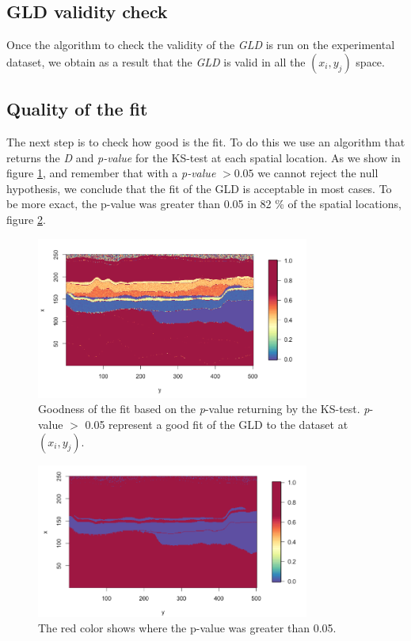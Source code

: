 \subsection{GLD validity check}\label{useCaseGLDValidityCheck}
Once the algorithm to check the validity of the \textit{GLD} is run on the experimental dataset, we obtain as a result that the \textit{GLD} is valid in all the $(x_{i},y_{j})$ space.

\subsection{Quality of the fit}\label{useCaseQualityofFit}
The next step is to check how good is the fit. To do this we use an algorithm that returns the \textit{D} and \textit{p-value} for the KS-test at each spatial location. As we show in figure \ref{fig:p_value}, and remember that with a \textit{p-value} $>0.05$ we cannot reject the null hypothesis, we conclude that the fit of the GLD is acceptable in most cases. To be more exact, the p-value was greater than 0.05 in 82 \% of the spatial locations, figure \ref{fig:p_values_greater_05}.

\begin{figure}[H]
    \centering
    \includegraphics[width=0.8\textwidth]{images/p_value.png}
    \caption{Goodness of the fit based on the \textit{p}-value returning by the KS-test. \textit{p}-value $>$ 0.05 represent a good fit of the GLD to the dataset at $(x_{i}, y_{j})$.}
    \label{fig:p_value}
\end{figure}

\begin{figure}[H]
    \centering
    \includegraphics[width=0.8\textwidth]{images/p_value_greater_05.png}
    \caption{The red color shows where the p-value was greater than 0.05.}
    \label{fig:p_values_greater_05}
\end{figure}

